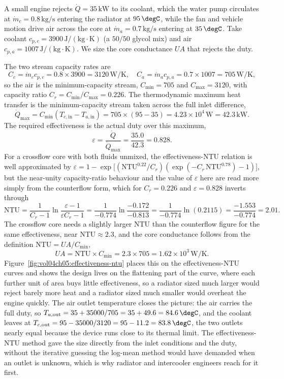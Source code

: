 A small engine rejects $\dot{Q} = 35\,\text{kW}$ to its coolant, which the water
pump circulates at $\dot{m}_c = 0.8\,\text{kg/s}$ entering the radiator at
$95\,\degC$, while the fan and vehicle motion drive air across the core at
$\dot{m}_a = 0.7\,\text{kg/s}$ entering at $35\,\degC$. Take coolant
$c_{p,c} = 3900\,\text{J}/(\text{kg}\cdot\si{\kelvin})$ (a $50/50$ glycol mix)
and air $c_{p,a} = 1007\,\text{J}/(\text{kg}\cdot\si{\kelvin})$. We size the
core conductance $UA$ that rejects the duty.

The two stream capacity rates are
\[
C_c = \dot{m}_c c_{p,c} = 0.8\times 3900 = 3120\,\text{W}/\si{\kelvin}, \quad
C_a = \dot{m}_a c_{p,a} = 0.7\times 1007 = 705\,\text{W}/\si{\kelvin},
\]
so the air is the minimum-capacity stream, $C_{\min} = 705$ and $C_{\max} =
3120$, with capacity ratio $C_r = C_{\min}/C_{\max} = 0.226$. The thermodynamic
maximum heat transfer is the minimum-capacity stream taken across the full inlet
difference,
\[
\dot{Q}_{\max} = C_{\min}(T_{c,\text{in}} - T_{a,\text{in}}) = 705\times(95 -
35) = 4.23\times10^{4}\,\text{W} = 42.3\,\text{kW}.
\]
The required effectiveness is the actual duty over this maximum,
\[
\varepsilon = \frac{\dot{Q}}{\dot{Q}_{\max}} = \frac{35.0}{42.3} = 0.828.
\]
For a crossflow core with both fluids unmixed, the effectiveness-NTU relation is
well approximated by $\varepsilon = 1 - \exp\!\big[(\text{NTU}^{0.22}/C_r)
(\exp(-C_r\,\text{NTU}^{0.78}) - 1)\big]$, but the near-unity capacity-ratio
behaviour and the value of $\varepsilon$ here are read more simply from the
counterflow form, which for $C_r = 0.226$ and $\varepsilon = 0.828$ inverts
through
\[
\text{NTU} = \frac{1}{C_r - 1}\ln\!\frac{\varepsilon - 1}{\varepsilon C_r - 1}
= \frac{1}{-0.774}\ln\!\frac{-0.172}{-0.813} = \frac{1}{-0.774}\ln(0.2115) =
\frac{-1.553}{-0.774} = 2.01.
\]
The crossflow core needs a slightly larger NTU than the counterflow figure for
the same effectiveness, near $\text{NTU}\approx 2.3$, and the core conductance
follows from the definition $\text{NTU} = UA/C_{\min}$,
\[
UA = \text{NTU}\times C_{\min} = 2.3 \times 705 = 1.62\times10^{3}\,\text{W}/
\si{\kelvin}.
\]
Figure~\ref{fig:vol04ch05:effectiveness-ntu} places this on the
effectiveness-NTU curves and shows the design lives on the flattening part of
the curve, where each further unit of area buys little effectiveness, so a
radiator sized much larger would reject barely more heat and a radiator sized
much smaller would overheat the engine quickly. The air outlet temperature
closes the picture: the air carries the full duty, so $T_{a,\text{out}} =
35 + 35000/705 = 35 + 49.6 = 84.6\,\degC$, and the coolant leaves at
$T_{c,\text{out}} = 95 - 35000/3120 = 95 - 11.2 = 83.8\,\degC$, the two outlets
nearly equal because the device runs close to its thermal limit. The
effectiveness-NTU method gave the size directly from the inlet conditions and
the duty, without the iterative guessing the log-mean method would have demanded
when an outlet is unknown, which is why radiator and intercooler engineers reach
for it first.

